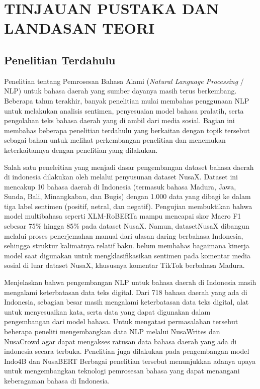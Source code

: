 
\chapter{TINJAUAN PUSTAKA DAN LANDASAN TEORI}

\section{Penelitian Terdahulu}

Penelitian tentang Pemrosesan Bahasa Alami (\textit{Natural Language Processing} / NLP) untuk bahasa daerah yang sumber dayanya masih terus berkembang. Beberapa tahun terakhir, banyak penelitian mulai membahas penggunaan NLP untuk melakukan analisis sentimen, penyesuaian model bahasa pralatih, serta pengolahan teks bahasa daerah yang di ambil dari media sosial. Bagian ini membahas beberapa penelitian terdahulu yang berkaitan dengan topik tersebut sebagai bahan untuk melihat perkembangan penelitian dan menemukan keterkaitannya dengan penelitian yang dilakukan.

Salah satu peneleitian yang menjadi dasar pengembangan dataset bahasa daerah di indonesia dilakukan oleh \citet{winata2023nusax} melalui penyusunan dataset NusaX. Dataset ini mencakup 10 bahasa daerah di Indonesia (termasuk bahasa Madura, Jawa, Sunda, Bali, Minangkabau, dan Bugis) dengan 1.000 data yang dibagi ke dalam tiga label sentimen (positif, netral, dan negatif). Pengujian \citet{winata2023nusax} membuktikan bahwa model multibahasa seperti XLM-RoBERTa mampu mencapai skor Macro F1 sebesar 75\% hingga 85\% pada dataset NusaX. Namun, datasetNusaX dibangun melalui proses penerjemahan manual dari ulasan daring berbahasa Indonesia, sehingga struktur kalimatnya relatif baku. \citet{winata2023nusax} belum membahas bagaimana kinerja model saat digunakan untuk mengklasifikasikan sentimen pada komentar media sosial di luar dataset NusaX, khususnya komentar TikTok berbahasa Madura.

\citet{aji2022one} Menjelaskan bahwa pengembangan NLP untuk bahasa daerah di Indonesia masih mengalami keterbatasan data teks digital. Dari 718 bahasa daerah yang ada di Indonesia, sebagian besar masih mengalami keterbatasan data teks digital, alat untuk menyesuaikan kata, serta data yang dapat digunakan dalam pengembangan dari model bahasa. Untuk mengatasi permasalahan tersebut beberapa peneliti mengembangkan data NLP melalui NusaWrites \citep{cahyawijaya2023nusawrites} dan NusaCrowd \citep{cahyawijaya2023nusacrowd} agar dapat mengakses ratusan data bahasa daerah yang ada di indonesia secara terbuka. Penelitian juga dilakukan pada pengembangan model Indo4B \citep{cahyawijaya2021indo4b} dan NusaBERT \citep{wongso2024nusabert} Berbagai penelitian tersebut menunjukkan adanya upaya untuk mengembangkan teknologi pemrosesan bahasa yang dapat menangani keberagaman bahasa di Indonesia.

